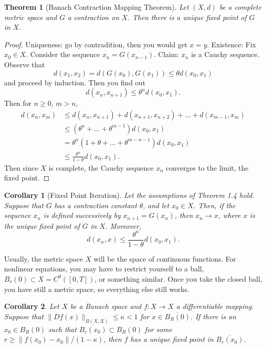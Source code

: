 \documentclass[letterpaper,twoside,12pt]{article}
\theoremstyle{mystyle}
\newtheorem{theorem}{Theorem}[section]
\newtheorem{corollary}{Corollary}[theorem]
\begin{document}
  \begin{tcolorbox}[colback=red!5!white,colframe=red!75!black]
    \begin{theorem}[Banach Contraction Mapping Theorem]
      Let \((X,d)\) be a complete metric space and \(G\) a contraction on \(X\). Then there is a unique fixed point of \(G\) in $X$. 
    \end{theorem}
  \end{tcolorbox}
  \begin{proof}
    Uniqueness: go by contradition, then you would get \(x=y\). 
    Existence: Fix $x_0 \in X$. Consider the sequence \(x_n = G(x_{n-1})\). Claim: $x_n$ is a Cauchy sequence. Observe that 
    \[d(x_1, x_2) = d(G(x_0), G(x_1))\leq \theta d(x_0, x_1)\]
    and proceed by induction. Then you find out 
    \[d(x_n, x_{n+1}) \leq \theta^n d(x_0, x_1).\] 
    Then for $n \geq 0$, $m > n$, 
    \begin{align*}
      d(x_n, x_m) &\leq d(x_n, x_{n+1}) + d(x_{n+1}, x_{n+2}) + \dots + d(x_{m-1}, x_m)\\
      &\leq \left( \theta^n  + \dots + \theta^{m-1} \right) d\left( x_0, x_1 \right)\\
      &=\theta^n \left( 1 + \theta + \dots + \theta^{m-n-1} \right)d(x_0, x_1)\\
      &\leq \frac{\theta^n}{1-\theta}d(x_0, x_1).
    \end{align*}
    Then since $X$ is complete, the Cauchy sequence \(x_n\) converges to the limit, the fixed point. 
  \end{proof}
  \begin{tcolorbox}[colback=red!5!white,colframe=red!75!black]
    \begin{corollary}[Fixed Point Iteration]
      Let the assumptions of Theorem 1.4 hold. Suppose that \(G\) has a contraction constant \(\theta\), and let $x_0 \in X$. Then, if the sequence $x_n$ is defined successively by \(x_{n+1} = G(x_n)\), then \(x_n \to x\), where $x$ is the unique fixed point of \(G\) in \(X\). Moreover, 
      \[d(x_n, x) \leq \frac{\theta^n}{1-\theta}d(x_0, x_1).\]
    \end{corollary}
  \end{tcolorbox}
  Usually, the metric space \(X\) will be the space of continuous functions. For nonlinear equations, you may have to restrict yourself to a ball, $B_r(0) \subset X = C^0([0,T])$, or something similar. Once you take the closed ball, you have still a metric space, so everything else still works. 
  \begin{tcolorbox}[colback=red!5!white,colframe=red!75!black]
    \begin{corollary}
      Let \(X\) be a Banach space and \(f: X \to X\) a differentiable mapping. Suppose that $\|Df(x)\|_{B(X,X)} \leq \kappa < 1$ for $x \in \overline{B_R(0)}$. If there is an $x_0 \in B_R(0)$ such that \(\overline{B_r(x_0)}\subset B_R(0)\) for some $r \geq \|f(x_0) - x_0\|/(1-\kappa)$, then \(f\) has a unique fixed point in \(\overline{B_r(x_0)}\).  
    \end{corollary}
  \end{tcolorbox}
\end{document}
